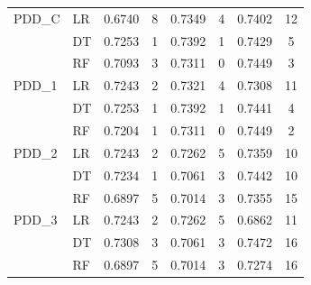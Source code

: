 \begin{table}[h]
\begin{tabular}{llcccccc}
    \midrule
    PDD\_C   & LR & 0.6740 & 8 & 0.7349 & 4 & 0.7402 & 12 \\
             & DT & 0.7253 & 1 & 0.7392 & 1 & 0.7429 & 5 \\
             & RF & 0.7093 & 3 & 0.7311 & 0 & 0.7449 & 3 \\
    \midrule
    PDD\_1   & LR & 0.7243 & 2 & 0.7321 & 4 & 0.7308 & 11 \\
             & DT & 0.7253 & 1 & 0.7392 & 1 & 0.7441 & 4 \\
             & RF & 0.7204 & 1 & 0.7311 & 0 & 0.7449 & 2 \\
    \midrule
    PDD\_2   & LR & 0.7243 & 2 & 0.7262 & 5 & 0.7359 & 10 \\
             & DT & 0.7234 & 1 & 0.7061 & 3 & 0.7442 & 10 \\
             & RF & 0.6897 & 5 & 0.7014 & 3 & 0.7355 & 15 \\
    \midrule
    PDD\_3   & LR & 0.7243 & 2 & 0.7262 & 5 & 0.6862 & 11 \\
             & DT & 0.7308 & 3 & 0.7061 & 3 & 0.7472 & 16 \\
             & RF & 0.6897 & 5 & 0.7014 & 3 & 0.7274 & 16 \\
    \bottomrule
    \end{tabular}
\end{table}

